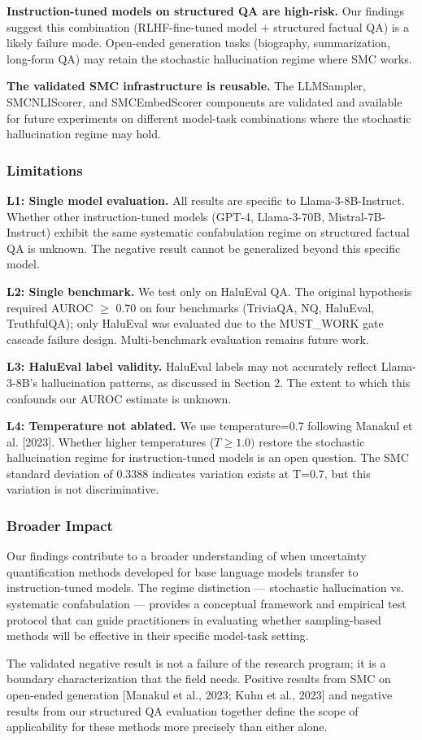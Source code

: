 \textbf{Instruction-tuned models on structured QA are high-risk.} Our findings suggest this combination (RLHF-fine-tuned model + structured factual QA) is a likely failure mode. Open-ended generation tasks (biography, summarization, long-form QA) may retain the stochastic hallucination regime where SMC works.

\textbf{The validated SMC infrastructure is reusable.} The LLMSampler, SMCNLIScorer, and SMCEmbedScorer components are validated and available for future experiments on different model-task combinations where the stochastic hallucination regime may hold.

\subsubsection{Limitations}

\textbf{L1: Single model evaluation.} All results are specific to Llama-3-8B-Instruct. Whether other instruction-tuned models (GPT-4, Llama-3-70B, Mistral-7B-Instruct) exhibit the same systematic confabulation regime on structured factual QA is unknown. The negative result cannot be generalized beyond this specific model.

\textbf{L2: Single benchmark.} We test only on HaluEval QA. The original hypothesis required AUROC $\geq$ 0.70 on four benchmarks (TriviaQA, NQ, HaluEval, TruthfulQA); only HaluEval was evaluated due to the MUST\_WORK gate cascade failure design. Multi-benchmark evaluation remains future work.

\textbf{L3: HaluEval label validity.} HaluEval labels may not accurately reflect Llama-3-8B's hallucination patterns, as discussed in Section 2. The extent to which this confounds our AUROC estimate is unknown.

\textbf{L4: Temperature not ablated.} We use temperature=0.7 following Manakul et al. [2023]. Whether higher temperatures ($T\geq 1.0)$ restore the stochastic hallucination regime for instruction-tuned models is an open question. The SMC standard deviation of 0.3388 indicates variation exists at T=0.7, but this variation is not discriminative.

\subsubsection{Broader Impact}

Our findings contribute to a broader understanding of when uncertainty quantification methods developed for base language models transfer to instruction-tuned models. The regime distinction --- stochastic hallucination vs. systematic confabulation --- provides a conceptual framework and empirical test protocol that can guide practitioners in evaluating whether sampling-based methods will be effective in their specific model-task setting.

The validated negative result is not a failure of the research program; it is a boundary characterization that the field needs. Positive results from SMC on open-ended generation [Manakul et al., 2023; Kuhn et al., 2023] and negative results from our structured QA evaluation together define the scope of applicability for these methods more precisely than either alone.

